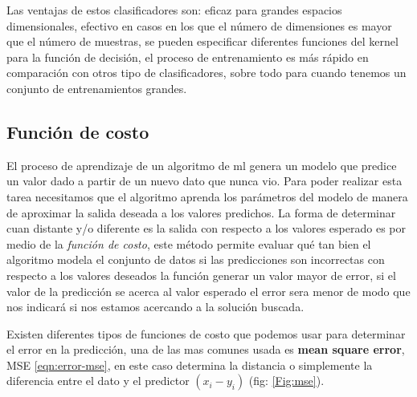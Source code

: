 Las ventajas de estos clasificadores son: eficaz para grandes espacios dimensionales, efectivo en casos en los que el número de dimensiones es mayor que el número de muestras, se pueden especificar diferentes funciones del kernel para la función de decisión, el proceso de entrenamiento es más rápido en comparación con otros tipo de clasificadores, sobre todo para cuando tenemos un conjunto de entrenamientos grandes.

\subsection{Función de costo}\label{sub:funcion_costo}

El proceso de aprendizaje de un algoritmo de \ac{ml} genera un  modelo que predice un valor dado a partir de un nuevo dato que nunca vio. Para poder realizar esta tarea necesitamos que el algoritmo aprenda los parámetros del modelo de manera de aproximar la salida deseada a los valores predichos. La forma de determinar cuan distante y/o diferente es la salida con respecto a los valores esperado es por medio de la \textit{función de costo}, este método permite evaluar qué tan bien el algoritmo modela el conjunto de datos si las predicciones son incorrectas con respecto a los valores deseados la función generar un valor mayor de error, si el valor de la predicción se acerca al valor esperado el error sera menor de modo que nos indicará si nos estamos acercando a la solución buscada.

Existen diferentes tipos de funciones de costo que podemos usar para determinar el error en la predicción, una de las mas comunes usada es \textbf{mean square error}, MSE \eqref{eqn:error-mse}, en este caso determina la distancia o simplemente la diferencia entre el dato y el predictor $(x_i - y_i) $ (fig: \ref{Fig:mse}).



